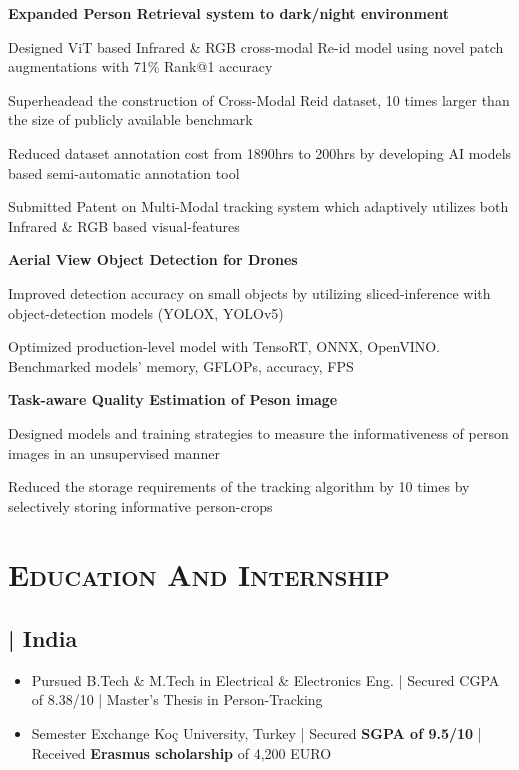 \documentclass[a4paper,10pt]{article}
\newcommand{\SubItem}[1]{
    {\setlength\itemindent{13pt} \item[\raisebox{.25\height}{\tiny\square}] #1}
}
\newlength{\itemgap}
\newlength{\itembefore}
\newcommand\scl{1.05}
\begin{document}
\begin{itemize}[topsep=\itembefore,itemsep=\itemgap,partopsep=0pt, parsep=0pt]


\item \textbf {Expanded Person Retrieval system to dark/night environment}
\SubItem{Designed ViT based Infrared \& RGB cross-modal Re-id model using novel patch augmentations with 71\% Rank@1 accuracy}
\SubItem{Superheadead the construction of Cross-Modal Reid dataset, 10 times larger than the size of publicly available benchmark}
\SubItem{Reduced dataset annotation cost from 1890hrs to 200hrs by developing AI models based semi-automatic annotation tool}
\SubItem{Submitted Patent on Multi-Modal tracking system which adaptively utilizes both Infrared \& RGB based visual-features}
\vspace{3pt}
\item \textbf {Aerial View Object Detection for Drones}
\SubItem{Improved detection accuracy on small objects by utilizing sliced-inference with object-detection models (YOLOX, YOLOv5)}
\SubItem{Optimized production-level model with TensoRT, ONNX, OpenVINO. Benchmarked models' memory, GFLOPs, accuracy, FPS}
\vspace{3pt}
\item \textbf {Task-aware Quality Estimation of Peson image}
\SubItem{Designed models and training strategies to measure the informativeness of person images in an unsupervised manner}
\SubItem{Reduced the storage requirements of the tracking algorithm by 10 times by selectively storing informative person-crops}
\end{itemize}






\section{\scshape{Education And Internship}}
\subsection{{\textbf{\scalebox{\scl}{Indian Institute of Technology Mumbai (IIT-Mumbai)}} | India }  \hfill\scalebox{0.9}{[Jul'15-Jul'20]}}
\begin{itemize}[topsep=\itembefore,itemsep=\itemgap,partopsep=0pt, parsep=0pt]
\item Pursued B.Tech \& M.Tech in Electrical \& Electronics Eng. | Secured {CGPA of 8.38/10} | Master's Thesis in Person-Tracking
\item{Semester Exchange Ko\c{c} University, Turkey | Secured \textbf{SGPA of 9.5/10} | Received \textbf{Erasmus scholarship } of 4,200 EURO }
\end{itemize}
\end{document}
